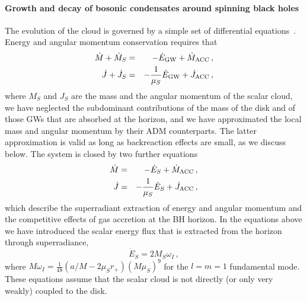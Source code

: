 \documentclass[11pt]{article}
\newcommand{\be}{\begin{equation}}
\newcommand{\ee}{\end{equation}}
\def\beq{\begin{eqnarray}}
\def\eeq{\end{eqnarray}}
\numberwithin{equation}{section} %
\begin{document}
\paragraph{Growth and decay of bosonic condensates around spinning black holes}
The evolution of the cloud is governed by a simple set of differential equations~\cite{Brito:2014wla}.
Energy and angular momentum conservation requires that
\begin{eqnarray}
 \dot{M}+\dot{M}_S&=&-\dot{E}_{\rm GW}+\dot M_{\rm ACC}\,,\\
 \dot{J}+\dot{J}_S&=&-\frac{1}{{\mu_S}}\dot{E}_{\rm GW}+\dot J_{\rm ACC}\,,
\end{eqnarray}
where $M_S$ and $J_S$ are the mass and the angular momentum of the scalar cloud, we have neglected the subdominant contributions of the mass of the disk and of those GWs that are absorbed at the horizon, and we have approximated the local mass and angular momentum by their ADM counterparts. The latter approximation is valid as long as backreaction effects are small, as we discuss below. The system is closed by two further equations
\beq
\dot{M}&=& -\dot{E}_S+\dot M_{\rm ACC} \,,\\
%
\dot{J}&=& -\frac{1}{{\mu_S}}\dot{E}_S +\dot J_{\rm ACC}\,,
%
\eeq
%
which describe the superradiant extraction of energy and angular momentum and the competitive effects of gas accretion at the BH horizon. In the equations above we have introduced the scalar energy flux that is extracted from the horizon through superradiance,
%
\be
\dot{E}_S=2M_S\omega_I\,,
\ee
%
where $M\omega_I=\frac{1}{48}({a/M-2{\mu_S} r_+})(M{\mu_S})^9$ for the $l=m=1$ fundamental mode. These equations assume that the scalar cloud is not directly (or only very weakly)  coupled to the disk.
\end{document}

